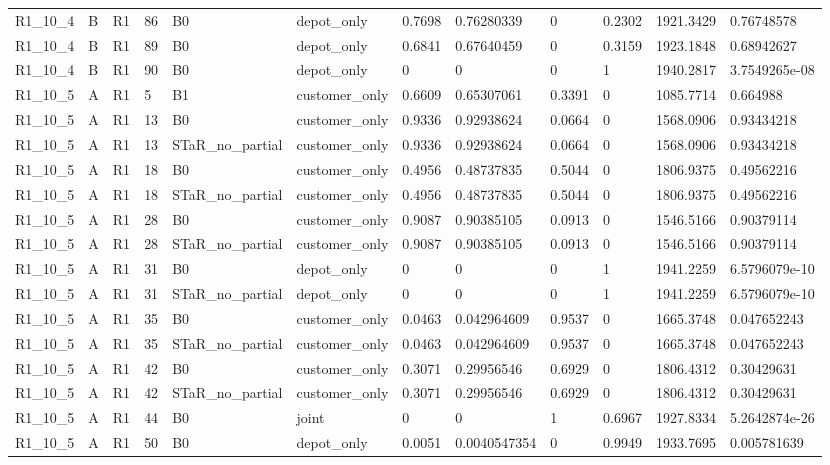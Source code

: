 \begin{longtable}{llllllllllll}
R1\_10\_4 & B & R1 & 86 & B0 & depot\_only & 0.7698 & 0.76280339 & 0 & 0.2302 & 1921.3429 & 0.76748578 \\
R1\_10\_4 & B & R1 & 89 & B0 & depot\_only & 0.6841 & 0.67640459 & 0 & 0.3159 & 1923.1848 & 0.68942627 \\
R1\_10\_4 & B & R1 & 90 & B0 & depot\_only & 0 & 0 & 0 & 1 & 1940.2817 & 3.7549265e-08 \\
R1\_10\_5 & A & R1 & 5 & B1 & customer\_only & 0.6609 & 0.65307061 & 0.3391 & 0 & 1085.7714 & 0.664988 \\
R1\_10\_5 & A & R1 & 13 & B0 & customer\_only & 0.9336 & 0.92938624 & 0.0664 & 0 & 1568.0906 & 0.93434218 \\
R1\_10\_5 & A & R1 & 13 & STaR\_no\_partial & customer\_only & 0.9336 & 0.92938624 & 0.0664 & 0 & 1568.0906 & 0.93434218 \\
R1\_10\_5 & A & R1 & 18 & B0 & customer\_only & 0.4956 & 0.48737835 & 0.5044 & 0 & 1806.9375 & 0.49562216 \\
R1\_10\_5 & A & R1 & 18 & STaR\_no\_partial & customer\_only & 0.4956 & 0.48737835 & 0.5044 & 0 & 1806.9375 & 0.49562216 \\
R1\_10\_5 & A & R1 & 28 & B0 & customer\_only & 0.9087 & 0.90385105 & 0.0913 & 0 & 1546.5166 & 0.90379114 \\
R1\_10\_5 & A & R1 & 28 & STaR\_no\_partial & customer\_only & 0.9087 & 0.90385105 & 0.0913 & 0 & 1546.5166 & 0.90379114 \\
R1\_10\_5 & A & R1 & 31 & B0 & depot\_only & 0 & 0 & 0 & 1 & 1941.2259 & 6.5796079e-10 \\
R1\_10\_5 & A & R1 & 31 & STaR\_no\_partial & depot\_only & 0 & 0 & 0 & 1 & 1941.2259 & 6.5796079e-10 \\
R1\_10\_5 & A & R1 & 35 & B0 & customer\_only & 0.0463 & 0.042964609 & 0.9537 & 0 & 1665.3748 & 0.047652243 \\
R1\_10\_5 & A & R1 & 35 & STaR\_no\_partial & customer\_only & 0.0463 & 0.042964609 & 0.9537 & 0 & 1665.3748 & 0.047652243 \\
R1\_10\_5 & A & R1 & 42 & B0 & customer\_only & 0.3071 & 0.29956546 & 0.6929 & 0 & 1806.4312 & 0.30429631 \\
R1\_10\_5 & A & R1 & 42 & STaR\_no\_partial & customer\_only & 0.3071 & 0.29956546 & 0.6929 & 0 & 1806.4312 & 0.30429631 \\
R1\_10\_5 & A & R1 & 44 & B0 & joint & 0 & 0 & 1 & 0.6967 & 1927.8334 & 5.2642874e-26 \\
R1\_10\_5 & A & R1 & 50 & B0 & depot\_only & 0.0051 & 0.0040547354 & 0 & 0.9949 & 1933.7695 & 0.005781639 \\

\end{longtable}
